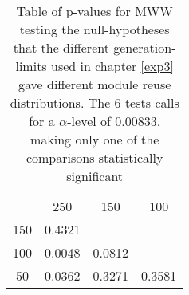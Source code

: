 \begin{table}[h]
    \centering
    \begin{tabular}{cccc}
        & 250    & 150    & 100    \\
    150 & 0.4321 &        &        \\
    100 & 0.0048 & 0.0812 &        \\
    50  & 0.0362 & 0.3271 & 0.3581
    \end{tabular}
    \caption[P-table for generation-limit testing]{Table of p-values for MWW testing the null-hypotheses that the different generation-limits used in chapter \ref{exp3} gave different module reuse distributions. The 6 tests calls for a \(\alpha\)-level of 0.00833, making only one of the comparisons statistically significant}
    \label{tab:ptable.generationlimit}
\end{table}